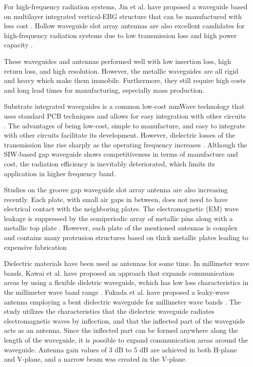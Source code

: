 \documentclass[a4paper,12pt]{report}
\begin{document}
For high-frequency radiation systems,
Jin et al. have proposed a waveguide
based on multilayer integrated vertical-EBG structure
that can be manufactured with less cost
\cite{9538996}.
Hollow waveguide slot array antennas are also
excellent candidates for high-frequency radiation systems due to low
transmission loss and high power capacity
\cite{5784313} \cite{7762807}.

These waveguides and antennas performed well with
low insertion loss, high return
loss, and high resolution.
However, the metallic waveguides are all rigid and heavy
which make them immobile.
Furthermore, they still require high costs and long lead times for manufacturing,
especially mass production.

Substrate integrated waveguides
is a common low-cost mmWave technology that uses
standard PCB techniques and allows for easy integration
with other circuits
\cite[]{7296630,7918508,4814705,5439781}.
The advantages of being low-cost, simple
to manufacture,
and easy to integrate with other circuits facilitate its development.
However, dielectric losses of
the transmission line rise sharply as the operating frequency
increases \cite{8581479}.
Although the SIW-based gap waveguide shows
competitiveness in terms of manufacture and cost, the radiation
efficiency is inevitably deteriorated,
which limits its application in higher frequency band.

Studies on the groove gap waveguide slot array antenna
are also increasing recently.
Each plate, with small air gaps in between,
does not need to have
electrical contact with the neighboring plates.
The electromagnetic (EM)
wave leakage is suppressed by the semiperiodic array of
metallic pins along with a metallic top plate
\cite[]{5608486,6157653,7931702,8359490,8668424}.
However, each plate of the
mentioned antennas is complex and contains many %
protrusion structures based on thick metallic plates leading to
expensive fabrication

Dielectric materials have been used as antennas for some time.
In millimeter wave bands, Kawai et al. have proposed an approach that expands
communication areas by using a flexible dieletric waveguide,
wchich has low loss characteristics in the millimeter wave band range \cite{new_area_formation_approach}.
Fukuda et al. have proposed a leaky-wave antenna employing a bent dielectric waveguide for
millimeter wave bands \cite{leaky_wave_antenna_bent_dielectric}.
The study utilizes the characteristics that the
dielectric waveguide radiates electromagnetic waves by
inflection, and that the inflected part of the waveguide acts as
an antenna.
Since the inflected part can be formed anywhere along the length of
the waveguide, it is possible to expand communication areas
around the waveguide. 
Antenna gain values of 3 dB to 5 dB are
achieved in both H-plane and V-plane,
and a narrow beam was created in the V-plane.
\end{document}

